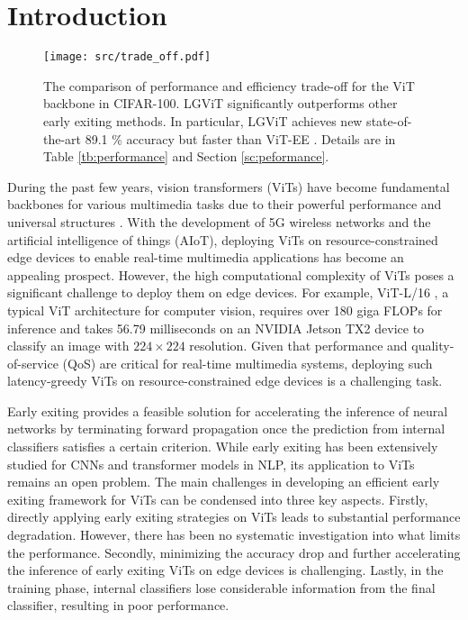 \section{Introduction}
\label{sc:intro}

\begin{figure}
    \begin{center}
      \texttt{[image: src/trade\_off.pdf]}
    \end{center}
    \vspace{-8pt}
    \caption{The comparison of performance and efficiency trade-off for the ViT backbone in CIFAR-100. LGViT significantly outperforms other early exiting methods. 
    In particular, LGViT achieves new state-of-the-art 89.1 \% accuracy but faster than ViT-EE \cite{ViT-EE}. Details are in Table \ref{tb:performance} and Section \ref{sc:peformance}. }
    \vspace{-12pt}
    \label{fig:trade-off}
  \end{figure}

During the past few years, vision transformers (ViTs) have become fundamental backbones for various multimedia tasks due to their powerful performance and universal structures \cite{vit, DBLP:conf/mm/WuRWW022, tvformer}. 
With the development of 5G wireless networks and the artificial intelligence of things (AIoT), 
deploying ViTs on resource-constrained edge devices to enable real-time multimedia applications has become an appealing prospect. 
However, the high computational complexity of ViTs poses a significant challenge to deploy them on edge devices. 
For example, ViT-L/16 \cite{deit}, a typical ViT architecture for computer vision, 
requires over 180 giga FLOPs for inference and takes 56.79 milliseconds on an NVIDIA Jetson TX2 device to classify an image with $224\times 224$ resolution. 
Given that performance and quality-of-service (QoS) are critical for real-time multimedia systems, deploying such latency-greedy ViTs on resource-constrained edge devices is a challenging task.

Early exiting provides a feasible solution for accelerating the inference of neural networks by terminating forward propagation once the prediction from internal classifiers satisfies a certain criterion. 
While early exiting has been extensively studied for CNNs and transformer models in NLP, its application to ViTs remains an open problem. 
The main challenges in developing an efficient early exiting framework for ViTs can be condensed into three key aspects. 
Firstly, directly applying early exiting strategies on ViTs leads to substantial performance degradation. 
However, there has been no systematic investigation into what limits the performance. %
Secondly, minimizing the accuracy drop and further accelerating the inference of early exiting ViTs on edge devices is challenging. 
Lastly, in the training phase, internal classifiers lose considerable information from the final classifier, resulting in poor performance. 


